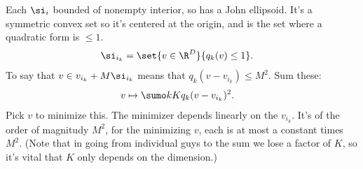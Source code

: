 Each $\si_i$ bounded of nonempty interior, so has a John ellipsoid. It's a symmetric convex set so it's centered at the origin, and is the set where a quadratic form is $\le 1$.
\begin{align}
\si_{i_k} &= \set{v\in \R^D}{q_k(v)\le 1}. 
\end{align}
To say that $v\in v_{i_k}+M\si_{i_k}$ means that $q_k(v-v_{i_k}) \le M^2$. Sum these: 
\begin{align}
v&\mapsto \sumo kK q_k(v-v_{i_k})^2.
\end{align}
Pick $v$ to minimize this. 
The minimizer depends linearly on the $v_{i_k}$. It's of the order of magnitudy $M^2$, for the minimizing $v$, each is at most a constant times $M^2$. %
(Note that in going from individual guys to the sum we lose a factor of $K$, so it's vital that $K$ only depends on the dimension.)



